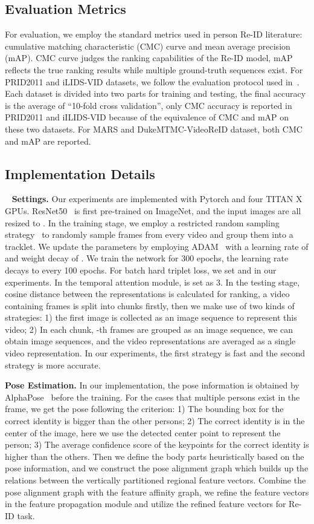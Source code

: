 \documentclass[journal]{IEEEtran}
\begin{document}
\subsection{Evaluation Metrics}
For evaluation, we employ the standard metrics used in person Re-ID literature: cumulative matching characteristic (CMC) curve and mean average precision (mAP). CMC curve judges the ranking capabilities of the Re-ID model, mAP reflects the true ranking results while multiple ground-truth sequences exist. For PRID2011 and iLIDS-VID datasets, we follow the evaluation protocol used in~\cite{Wang_2014_ECCV}. Each dataset is divided into two parts for training and testing, the final accuracy is the average of ``10-fold cross validation'', only CMC accuracy is reported in PRID2011 and iILIDS-VID because of the equivalence of CMC and mAP on these two datasets. For MARS and DukeMTMC-VideoReID dataset, both CMC and mAP are reported.

\subsection{Implementation Details}~\label{sec:implement}
\textbf{Settings.}
Our experiments are implemented with Pytorch and four TITAN X GPUs. ResNet50~\cite{He_2016_CVPR} is first pre-trained on ImageNet, and the input images are all resized to . In the training stage, we employ a restricted random sampling strategy~\cite{Li_2018_CVPR} to randomly sample  frames from every video and group them into a tracklet. We update the parameters by employing ADAM~\cite{Kingma_2015_ICLR} with a learning rate of  and weight decay of . We train the network for 300 epochs, the learning rate decays to  every 100 epochs. For batch hard triplet loss, we set  and  in our experiments. In the temporal attention module,  is set as 3.
In the testing stage, cosine distance between the representations is calculated for ranking, a video containing  frames is split into  chunks firstly, then we make use of two kinds of strategies: 1) the first image is collected as an image sequence to represent this video; 2) In each chunk, -th frames are grouped as an image sequence, we can obtain  image sequences, and the video representations are averaged as a single video representation. In our experiments, the first strategy is fast and the second strategy is more accurate.

\textbf{Pose Estimation.}
In our implementation, the pose information is obtained by AlphaPose~\cite{Su_2017_ICCV} before the training. For the cases that multiple persons exist in the frame, we get the pose following the criterion: 1) The bounding box for the correct identity is bigger than the other persons; 2) The correct identity is in the center of the image, here we use the detected center point to represent the person; 3) The average confidence score of the keypoints for the correct identity is higher than the others.
Then we define the body parts heuristically based on the pose information, and we construct the pose alignment graph which builds up the relations between the vertically partitioned regional feature vectors. Combine the pose alignment graph with the feature affinity graph, we refine the feature vectors in the feature propagation module and utilize the refined feature vectors for Re-ID task.
\end{document}
